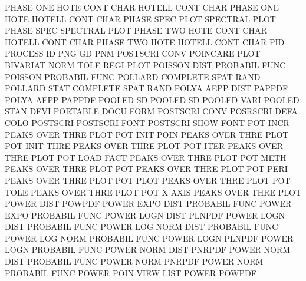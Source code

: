 PHASE    ONE  HOTE CONT CHAR            HOTELL   CONT CHAR
PHASE    ONE  HOTE                      HOTELL   CONT CHAR
PHASE    SPEC PLOT                      SPECTRAL PLOT
PHASE    SPEC                           SPECTRAL PLOT
PHASE    TWO  HOTE CONT CHAR            HOTELL   CONT CHAR
PHASE    TWO  HOTE                      HOTELL   CONT CHAR
PID                                     PROCESS  ID
PNG                                     GD
PNM                                     POSTSCRI CONV
POINCARE PLOT                           BIVARIAT NORM TOLE REGI PLOT
POISSON  DIST                           PROBABIL FUNC
POISSON                                 PROBABIL FUNC
POLLARD                                 COMPLETE SPAT RAND
POLLARD  STAT                           COMPLETE SPAT RAND
POLYA    AEPP DIST                      PAPPDF
POLYA    AEPP                           PAPPDF
POOLED   SD                             POOLED   SD
POOLED   VARI                           POOLED   STAN DEVI
PORTABLE DOCU FORM                      POSTSCRI CONV
POSRSCRI DEFA COLO                      POSTSCRI
POSTSCRI FONT                           POSTSCRI SHOW FONT
POT      INCR                           PEAKS    OVER THRE PLOT
POT      INIT POIN                      PEAKS    OVER THRE PLOT
POT      INIT THRE                      PEAKS    OVER THRE PLOT
POT      ITER                           PEAKS    OVER THRE PLOT
POT      LOAD FACT                      PEAKS    OVER THRE PLOT
POT      METH                           PEAKS    OVER THRE PLOT
POT                                     PEAKS    OVER THRE PLOT
POT      PERI                           PEAKS    OVER THRE PLOT
POT      PLOT                           PEAKS    OVER THRE PLOT
POT      TOLE                           PEAKS    OVER THRE PLOT
POT      X    AXIS                      PEAKS    OVER THRE PLOT
POWER    DIST                           POWPDF
POWER    EXPO DIST                      PROBABIL FUNC
POWER    EXPO                           PROBABIL FUNC
POWER    LOGN DIST                      PLNPDF
POWER    LOGN DIST                      PROBABIL FUNC
POWER    LOG  NORM DIST                 PROBABIL FUNC
POWER    LOG  NORM                      PROBABIL FUNC
POWER    LOGN                           PLNPDF
POWER    LOGN                           PROBABIL FUNC
POWER    NORM DIST                      PNRPDF
POWER    NORM DIST                      PROBABIL FUNC
POWER    NORM                           PNRPDF
POWER    NORM                           PROBABIL FUNC
POWER    POIN VIEW                      LIST
POWER                                   POWPDF
